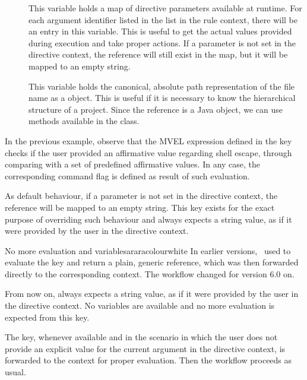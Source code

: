 \begin{description}
\begin{description}
\begin{description}
\item[] This variable holds a map of directive parameters available at runtime. For each argument identifier listed in the  list in the rule context, there will be an entry in this variable. This is useful to get the actual values provided during execution and take proper actions. If a parameter is not set in the directive context, the reference will still exist in the map, but it will be mapped to an empty string.

\item[] This variable holds the canonical, absolute path representation of the file name as a  object. This is useful if it is necessary to know the hierarchical structure of a project. Since the reference is a Java object, we can use methods available in the  class.
\end{description}

In the previous example, observe that the MVEL expression defined in the  key checks if the user provided an affirmative value regarding shell escape, through comparing  with a set of predefined affirmative values. In any case, the corresponding command flag is defined as result of such evaluation.

\item[\describecontext{O}{arguments}{default}] As default behaviour, if a parameter is not set in the directive context, the reference will be mapped to an empty string. This key exists for the exact purpose of overriding such behaviour and always expects a string value, as if it were provided by the user in the directive context.

\begin{messagebox}{No more evaluation and variables}{araracolour}{\icinfo}{white}
\setlength{\parskip}{1em}
In earlier versions, \arara\ used to evaluate the  key and return a plain, generic  reference, which was then forwarded directly to the corresponding  context. The workflow changed for version 6.0 on.

From now on,  always expects a string value, as if it were provided by the user in the directive context. No variables are available and no more evaluation is expected from this key.

The  key, whenever available and in the scenario in which the user does not provide an explicit value for the current argument in the directive context, is forwarded to the  context for proper evaluation. Then the workflow proceeds as usual.
\end{messagebox}


\end{description}
\end{description}
